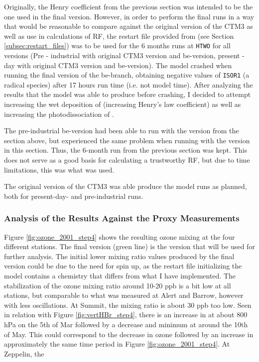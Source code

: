 Originally, the Henry coefficient from the previous section was intended to be the one used in the final version. However, in order to perform the final runs in a way that would be reasonable to compare against the original version of the CTM3 as well as use in calculations of RF, the restart file provided from \cite{StefaniePersonal} (see Section \ref{subsec:restart_files}) was to be used for the 6 months runs at \texttt{HTWO} for all versions (Pre - industrial with original CTM3 version and \acrshort{be}-version, present - day with original CTM3 version and \acrshort{be}-version). The model crashed when running the final version of the \acrshort{be}-branch, obtaining negative values of \texttt{ISOR1} (a radical species) after 17 hours run time (i.e. not model time). After analyzing the results that the model was able to produce before crashing, I decided to attempt increasing the wet deposition of  (increasing Henry's law coefficient) as well as increasing the photodissociation of . 


The pre-industrial \acrshort{be}-version had been able to run with the version from the section above, but experienced the same problem when running with the version in this section. Thus, the 6-month run from the previous section was kept. This does not serve as a good basis for calculating a trustworthy RF, but due to time limitations, this was what was used. 

\medskip

The original version of the CTM3 was able produce the model runs as planned, both for present-day- and pre-industrial runs. 

\subsubsection{Analysis of the Results Against the Proxy Measurements}

Figure \ref{fig:ozone_2001_step4} shows the resulting ozone mixing at the four different stations. The final version (green line) is the version that will be used for further analysis. The initial lower mixing ratio values produced by the final version could be due to the need for spin up, as the restart file initializing the model contains a chemistry that differs from what I have implemented. The stabilization of the ozone mixing ratio around 10-20 ppb is a bit low at all stations, but comparable to what was measured at Alert and Barrow, however with less oscillations. At Summit, the mixing ratio is about 30 ppb too low. Seen in relation with Figure \ref{fig:vertHBr_step4}, there is an increase in  at about 800 hPa on the 5th of Mar followed by a decrease and minimum at around the 10th of May. This could correspond to the decrease in ozone followed by an increase in approximately the same time period in Figure \ref{fig:ozone_2001_step4}. At Zeppelin, the  %

